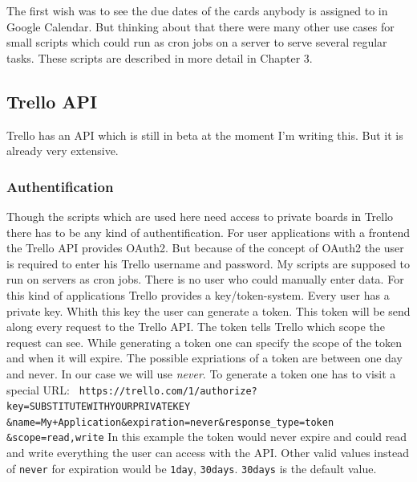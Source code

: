 The first wish was to see the due dates of the cards anybody is assigned to in Google Calendar. But thinking about that there were many other use cases for small scripts which could run as cron jobs on a server to serve several regular tasks. These scripts are described in more detail in Chapter 3.

\subsection{Trello API}
Trello has an API  which is still in beta at the moment I'm writing this. But it is already very extensive. \cite{trello:docu}

\subsubsection{Authentification}
Though the scripts which are used here need access to private boards in Trello there has to be any kind of authentification. For user applications with a frontend the Trello API provides OAuth2. But because of the concept of OAuth2 the user is required to enter his Trello username and password. \cite{oauth} My scripts are supposed to run on servers as cron jobs. There is no user who could manually enter data. For this kind of applications Trello provides a key/token-system. Every user has a private key. Whith this key the user can generate a token. This token will be send along every request to the Trello API. The token tells Trello which scope the request can see. While generating a token one can specify the scope of the token and when it will expire. The possible expriations of a token are between one day and never. In our case we will use \emph{never}. To generate a token one has to visit a special URL:
\texttt{
https://trello.com/1/authorize?key=SUBSTITUTEWITHYOURPRIVATEKEY \&name=My+Application\&expiration=never\&response\_type=token \&scope=read,write}
In this example the token would never expire and could read and write everything the user can access with the API. Other valid values instead of \texttt{never} for expiration would be \texttt{1day}, \texttt{30days}. \texttt{30days} is the default value. \cite{trello:gettingstarted}

